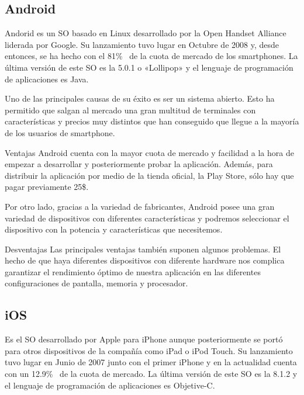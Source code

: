 \subsection{Android}

Andorid es un \acs{SO} basado en Linux desarrollado por la Open Handset Alliance liderada por
Google. Su lanzamiento tuvo lugar en Octubre de 2008 y, desde entonces, se ha hecho con el
81\%~\cite{Llamas13} de la cuota de mercado de los smartphones. La última versión de este \acs{SO}
 es la 5.0.1 o «Lollipop» y el lenguaje de programación de aplicaciones es Java.

Uno de las principales causas de su éxito es ser un sistema abierto. Esto ha permitido que salgan al
mercado una gran multitud de terminales con características y precios muy distintos que han
conseguido que llegue a la mayoría de los usuarios de smartphone.

\begin{definitionlist}
  \item[Ventajas] Android cuenta con la mayor cuota de mercado y facilidad a la hora de empezar a
    desarrollar y posteriormente probar la aplicación. Además, para distribuir la aplicación por
    medio de la tienda oficial, la Play Store, sólo hay que pagar previamente 25\$.

    Por otro lado, gracias a la variedad de fabricantes, Android posee una gran variedad de
    dispositivos con diferentes características y podremos seleccionar el dispositivo con la
    potencia y características que necesitemos.

  \item[Desventajas] Las principales ventajas también suponen algunos problemas. El hecho de que
    haya diferentes dispositivos con diferente hardware nos complica garantizar el rendimiento
    óptimo de nuestra aplicación en las diferentes configuraciones de pantalla, memoria y
    procesador.

\end{definitionlist}

\subsection{iOS}

Es el \acs{SO} desarrollado por Apple para iPhone aunque posteriormente se portó para otros
dispositivos de la compañía como iPad o iPod Touch. Su lanzamiento tuvo lugar en Junio de 2007 junto
con el primer iPhone y en la actualidad cuenta con un 12.9\%~\cite{Llamas13} de la cuota de
mercado. La última versión de este \acs{SO} es la 8.1.2 y el lenguaje de programación de
aplicaciones es Objetive-C.

